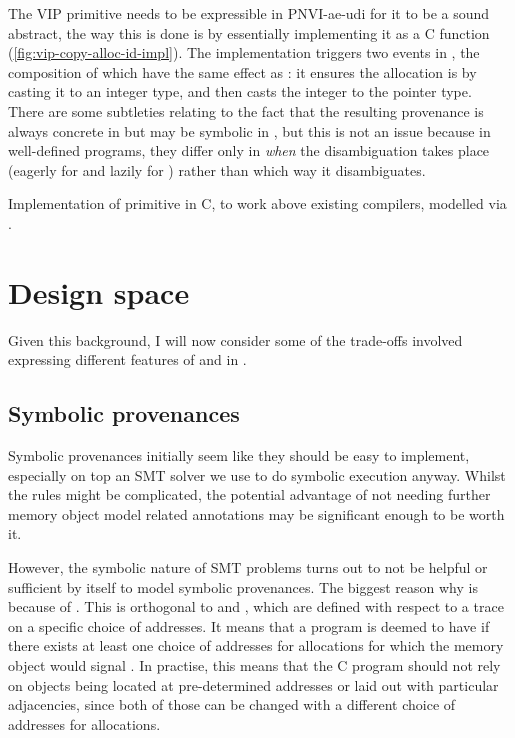 The VIP  primitive needs to be expressible in
PNVI-ae-udi for it to be a sound abstract, the way this is done is by
essentially implementing it as a C function
(\cref{fig:vip-copy-alloc-id-impl}). The implementation triggers two events in
, the composition of which have the same effect as
: it ensures the allocation is  by casting
it to an integer type, and then casts the integer to the pointer type. There
are some subtleties relating to the fact that the resulting provenance is
always concrete in  but may be symbolic in , but this
is not an issue because in well-defined programs, they differ only in
\emph{when} the disambiguation takes place (eagerly for  and lazily for
) rather than which way it disambiguates.

\begin{marginfigure}
    \caption{Implementation of   primitive in C, to
        work above existing compilers, modelled via
        .}\label{fig:vip-copy-alloc-id-impl}
\end{marginfigure}


\section{Design space}

Given this background, I will now consider some of the trade-offs involved
expressing different features of  and  in .

\subsection{Symbolic provenances}

Symbolic provenances initially seem like they should be easy to implement,
especially on top an SMT solver we use to do symbolic execution anyway. Whilst
the rules might be complicated, the potential advantage of not needing further
memory object model related annotations may be significant enough to be worth
it.

However, the symbolic nature of SMT problems turns out to not be helpful or
sufficient by itself to model symbolic provenances. The biggest reason why is
because of . This is
orthogonal to  and , which are defined with respect to
a trace on a specific choice of addresses. It means that a program is deemed to
have  if there exists at least one choice of addresses for allocations
for which the memory object would signal . In practise, this means that
the C program should not rely on objects being located at pre-determined
addresses or laid out with particular adjacencies, since both of those can be
changed with a different choice of addresses for allocations.

